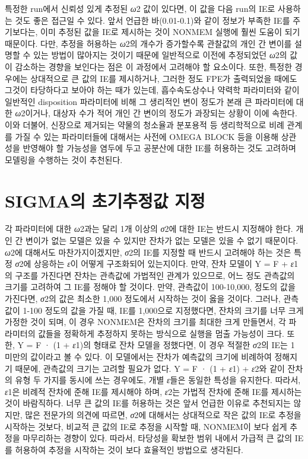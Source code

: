 \documentclass[
  10pt,
]{krantz}
\begin{document}
특정한 run에서 신뢰성 있게 추정된 \emph{ω}2 값이 있다면, 이 값을 다음 run의 IE로 사용하는 것도 좋은
접근일 수 있다. 앞서 언급한 바(0.01-0.1)와 같이 정보가 부족한 IE를 주기보다는, 이미 추정된 값을 IE로 제시하는
것이 NONMEM 실행에 훨씬 도움이 되기 때문이다. 다만, 추정을 허용하는 \emph{ω}2의 개수가
증가할수록 관찰값의 개인 간 변이를 설명할 수 있는 방법이 많아지는 것이기 때문에 일반적으로 이전에 추정되었던
\emph{ω}2의 값이 감소하는 경향을 보인다는 점은 이 과정에서 고려해야 할 요소이다. 또한, 특정한 경우에는
상대적으로 큰 값의 IE를 제시하거나, 그러한 정도 FPE가 출력되었을 때에도 그것이 타당하다고 보아야 하는 때가
있는데, 흡수속도상수나 약력학 파라미터와 같이 일반적인 disposition 파라미터에 비해 그 생리적인 변이 정도가
본래 큰 파라미터에 대한 \emph{ω}2이거나, 대상자 수가 적어 개인 간 변이의 정도가 과장되는 상황이 이에
속한다. 이와 더불어, 신장으로 제거되는 약물의 청소율과 분포용적 등 생리학적으로 비례 관계를 가질 수 있는 파라미터들에
대해서는 사전에 OMEGA BLOCK 등을 이용해 상관성을 반영해야 할 가능성을 염두에 두고 공분산에 대한 IE를 허용하는
것도 고려하며 모델링을 수행하는 것이 추천된다.

\hypertarget{sigmauxc758-uxcd08uxae30uxcd94uxc815uxac12-uxc9c0uxc815}{%
\section{SIGMA의 초기추정값 지정}\label{sigmauxc758-uxcd08uxae30uxcd94uxc815uxac12-uxc9c0uxc815}}

각 파라미터에 대한 \emph{ω}2과는 달리 1개 이상의 \emph{σ}2에 대한 IE는 반드시 지정해야 한다. 개인 간 변이가 없는 모델은 있을 수 있지만 잔차가 없는 모델은 있을 수 없기 때문이다. \emph{ω}2에 대해서도 마찬가지이겠지만, \emph{σ}2의 IE를 지정할 때 반드시 고려해야 하는 것은 특정 \emph{σ}2에 상응하는 \emph{ε}이 어떻게 구조화되어 있는지이다. 만약, 잔차 모델이 Y = F + \emph{ε}1의 구조를 가진다면 잔차는 관측값에 가법적인 관계가 있으므로, 어느 정도 관측값의 크기를 고려하여 그 IE를 정해야 할 것이다. 만약, 관측값이 100-10,000, 정도의 값을 가진다면, \emph{σ}2의 값은 최소한 1,000 정도에서 시작하는 것이 옳을 것이다. 그러나, 관측값이 1-100 정도의 값을 가질 때, IE를 1,000으로 지정했다면, 잔차의 크기를 너무 크게 가정한 것이 되며, 이 경우 NONMEM은 잔차의 크기를 최대한 크게 만들면서, 각 파라미터의 값들을 정확하게 추정하지 못하는 방식으로 실행을 멈출 가능성이 크다. 또한, Y = F · (1 + \emph{ε}1)의 형태로 잔차 모델을 정했다면, 이 경우 적절한 \emph{σ}2의 IE는 1 미만의 값이라고 볼 수 있다. 이 모델에서는 잔차가 예측값의 크기에 비례하여 정해지기 때문에, 관측값의 크기는 고려할 필요가 없다. Y = F · (1 + \emph{ε}1) + \emph{ε}2와 같이 잔차의 유형 두 가지를 동시에 쓰는 경우에도, 개별 \emph{ε}들은 동일한 특성을 유지한다. 따라서, \emph{ε}1은 비례적 잔차에 준해 IE를 제시해야 하며, \emph{ε}2는 가법적 잔차에 준해 IE를 제시하는 것이 바람직하다. 너무 큰 값의 IE를 허용하는 것은 앞서 언급한 이유로 추천되지는 않지만, 많은 전문가의 의견에 따르면, \emph{σ}2에 대해서는 상대적으로 작은 값의 IE로 추정을 시작하는 것보다, 비교적 큰 값의 IE로 추정을 시작할 때, NONMEM이 보다 쉽게 추정을 마무리하는 경향이 있다. 따라서, 타당성을 확보한 범위 내에서 가급적 큰 값의 IE를 허용하여 추정을 시작하는 것이 보다 효율적인 방법으로 생각된다.
\end{document}
